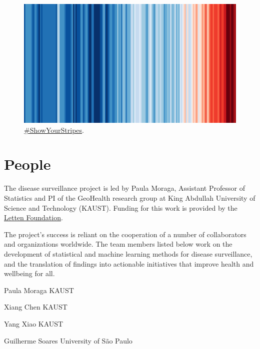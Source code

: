 \documentclass[
  letterpaper,
  DIV=11,
  numbers=noendperiod]{scrreprt}
\begin{document}
\begin{figure}

{\centering \includegraphics[width=1\textwidth,height=\textheight]{img/stripes1850-2022-MO.png}

}

\caption{\label{fig-stripes}\href{https://showyourstripes.info/}{\#ShowYourStripes}.}

\end{figure}


\hypertarget{people}{%
\chapter*{People}\label{people}}


The disease surveillance project is led by Paula Moraga, Assistant
Professor of Statistics and PI of the GeoHealth research group at King
Abdullah University of Science and Technology (KAUST). Funding for this
work is provided by the \href{https://letten.foundation/}{Letten
Foundation}.

The project's success is reliant on the cooperation of a number of
collaborators and organizations worldwide. The team members listed below
work on the development of statistical and machine learning methods for
disease surveillance, and the translation of findings into actionable
initiatives that improve health and wellbeing for all.

Paula Moraga KAUST

Xiang Chen KAUST

Yang Xiao KAUST

Guilherme Soares University of São Paulo
\end{document}
